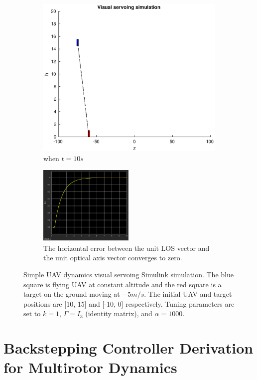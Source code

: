 \begin{figure}
\begin{subfigure}[b]{0.45\linewidth}
		\includegraphics[width=\textwidth]{images/chapter4/another_simple_ten}
		\caption{when $t=10s$}
	\end{subfigure}
	\begin{subfigure}[b]{0.8\linewidth}
		\centering
		\includegraphics[width=0.5\textwidth]{images/chapter4/another_simple_ex}
		\caption{The horizontal error between the unit LOS vector and the unit optical axis vector converges to zero.}
	\end{subfigure}	
	\caption{Simple UAV dynamics visual servoing Simulink simulation. The blue square is flying UAV at constant altitude and the red square is a target on the ground moving at $-5m/s$. The initial UAV and target positions are [10, 15] and [-10, 0] respectively. Tuning parameters are set to $k=1$, $\Gamma=I_3$ (identity matrix), and $\alpha=1000$.}
	\label{another_simple_simulation}
\end{figure}


\section{Backstepping Controller Derivation for Multirotor Dynamics}
